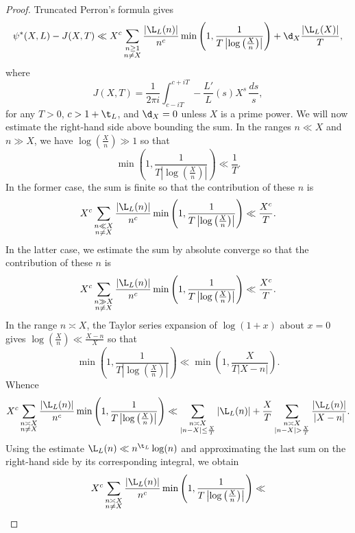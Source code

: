 \documentclass[12pt]{article}
\begin{document}
      \begin{proof}
        Truncated Perron's formula gives
        \[
          \psi^{\ast}(X,L)-J(X,T) \ll X^{c}\sum_{\substack{n \ge 1 \\ n \neq X}}\frac{|\L_{L}(n)|}{n^{c}}\min\left(1,\frac{1}{T\left|\log\left(\frac{X}{n}\right)\right|}\right)+\d_{X}\frac{|\L_{L}(X)|}{T},
        \]
        where
        \[
          J(X,T) = \frac{1}{2\pi i}\int_{c-iT}^{c+iT}-\frac{L'}{L}(s)X^{s}\,\frac{ds}{s},
        \]
        for any \(T > 0\), \(c > 1+\t_{L}\), and \(\d_{X} = 0\) unless \(X\) is a prime power. We will now estimate the right-hand side above bounding the sum. In the ranges \(n \ll X\) and \(n \gg X\), we have \(\log\left(\frac{X}{n}\right) \gg 1\) so that
        \[
          \min\left(1,\frac{1}{T\left|\log\left(\frac{X}{n}\right)\right|}\right) \ll \frac{1}{T}.
        \]
        In the former case, the sum is finite so that the contribution of these \(n\) is
        \[
          X^{c}\sum_{\substack{n \ll X \\ n \neq X}}\frac{|\L_{L}(n)|}{n^{c}}\min\left(1,\frac{1}{T\left|\log\left(\frac{X}{n}\right)\right|}\right) \ll \frac{X^{c}}{T}.
        \]
        In the latter case, we estimate the sum by absolute converge so that the contribution of these \(n\) is
        \[
          X^{c}\sum_{\substack{n \gg X \\ n \neq X}}\frac{|\L_{L}(n)|}{n^{c}}\min\left(1,\frac{1}{T\left|\log\left(\frac{X}{n}\right)\right|}\right) \ll \frac{X^{c}}{T}.
        \]
        In the range \(n \asymp X\), the Taylor series expansion of \(\log(1+x)\) about \(x = 0\) gives \(\log\left(\frac{X}{n}\right) \ll \frac{X-n}{X}\) so that
        \[
          \min\left(1,\frac{1}{T\left|\log\left(\frac{X}{n}\right)\right|}\right) \ll \min\left(1,\frac{X}{T|X-n|}\right).
        \]
        Whence
        \[
          X^{c}\sum_{\substack{n \asymp X \\ n \neq X}}\frac{|\L_{L}(n)|}{n^{c}}\min\left(1,\frac{1}{T\left|\log\left(\frac{X}{n}\right)\right|}\right) \ll \sum_{\substack{n \asymp X \\ |n-X| \le \frac{X}{T}}}|\L_{L}(n)|+\frac{X}{T}\sum_{\substack{n \asymp X \\ |n-X| > \frac{X}{T}}}\frac{|\L_{L}(n)|}{|X-n|}.
        \]
        Using the estimate \(\L_{L}(n) \ll n^{\t_{L}}\log(n)\) and approximating the last sum on the right-hand side by its corresponding integral, we obtain
        \[
          X^{c}\sum_{\substack{n \asymp X \\ n \neq X}}\frac{|\L_{L}(n)|}{n^{c}}\min\left(1,\frac{1}{T\left|\log\left(\frac{X}{n}\right)\right|}\right) \ll 
\]
\end{proof}
\end{document}
